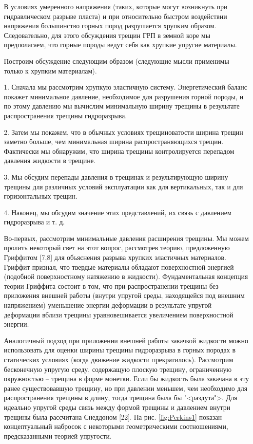 \documentclass[a4paper, 12pt]{article}
\begin{document}
В условиях умеренного напряжения (таких, которые могут возникнуть при гидравлическом разрыве пласта) и при относительно быстром воздействии напряжения большинство горных пород разрушается хрупким образом.
Следовательно, для этого обсуждения трещин ГРП в земной коре мы предполагаем, что горные породы ведут себя как хрупкие упругие материалы.

Построим обсуждение следующим образом (следующие мысли применимы только к хрупким материалам).

1. Сначала мы рассмотрим хрупкую эластичную систему.
Энергетический баланс покажет минимальное давление, необходимое для разрушения горной породы, и по этому давлению мы вычислим минимальную ширину трещины в результате распространения трещины гидроразрыва.

2. Затем мы покажем, что в обычных условиях трещиноватости ширина трещин заметно больше, чем минимальная ширина распространяющихся трещин.
Фактически мы обнаружим, что ширина трещины контролируется перепадом давления жидкости в трещине.

3. Мы обсудим перепады давления в трещинах и результирующую ширину трещины для различных условий эксплуатации как для вертикальных, так и для горизонтальных трещин.

4. Наконец, мы обсудим значение этих представлений, их связь с давлением гидроразрыва и т. д.

Во-первых, рассмотрим минимальные давления расширения трещины.
Мы можем пролить некоторый свет на этот вопрос, рассмотрев теорию, предложенную Гриффитом [7,8] для объяснения разрыва хрупких эластичных материалов.
Гриффит признал, что твердые материалы обладают поверхностной энергией (подобной поверхностному натяжению в жидкости).
Фундаментальная концепция теории Гриффита состоит в том, что при распространении трещины без приложения внешней работы (внутри упругой среды, находящейся под внешним напряжением) уменьшение энергии деформации в результате упругой деформации вблизи трещины уравновешивается увеличением поверхностной энергии.

Аналогичный подход при приложении внешней работы закачкой жидкости можно использовать для оценки ширины трещины гидроразрыва в горных породах в статических условиях (когда движение жидкости прекратилось).
Рассмотрим бесконечную упругую среду, содержащую плоскую трещину, ограниченную окружностью -- трещина в форме монетки.
Если бы жидкость была закачана в эту ранее существовавшую трещину, но при давлении меньшем, чем необходимо для распространения трещины в длину, тогда трещина была бы "<раздута">.
Для идеально упругой среды связь между формой трещины и давлением внутри трещины была рассчитана Снеддоном [22].
На рис. \ref{fig:Perkins1} показан концептуальный набросок с некоторыми геометрическими соотношениями, предсказанными теорией упругости.
\end{document}
